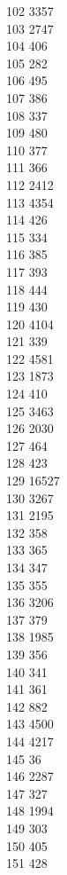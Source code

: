 { 102	3357 \\
 103	2747 \\
 104	406 \\
 105	282 \\
 106	495 \\
 107	386 \\
 108	337 \\
 109	480 \\
 110	377 \\
 111	366 \\
 112	2412 \\
 113	4354 \\
 114	426 \\
 115	334 \\
 116	385 \\
 117	393 \\
 118	444 \\
 119	430 \\
 120	4104 \\
 121	339 \\
 122	4581 \\
 123	1873 \\
 124	410 \\
 125	3463 \\
 126	2030 \\
 127	464 \\
 128	423 \\
 129	16527 \\
 130	3267 \\
 131	2195 \\
 132	358 \\
 133	365 \\
 134	347 \\
 135	355 \\
 136	3206 \\
 137	379 \\
 138	1985 \\
 139	356 \\
 140	341 \\
 141	361 \\
 142	882 \\
 143	4500 \\
 144	4217 \\
 145	36 \\
 146	2287 \\
 147	327 \\
 148	1994 \\
 149	303 \\
 150	405 \\
 151	428 \\
}
